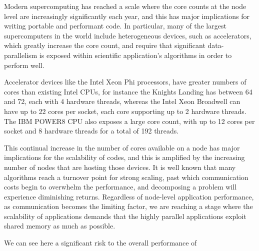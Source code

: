 \documentclass[runningheads,a4paper]{llncs}
\begin{document}
\label{sec:scalability-inhibit}

Modern supercomputing has reached a scale where the core counts at the node level are increasingly significantly each year, and this has major implications for writing portable and performant code. In particular, many of the largest supercomputers in the world include heterogeneous devices, such as accelerators, which greatly increase the core count, and require that significant data-parallelism is exposed within scientific application's algorithms in order to perform well.

Accelerator devices like the Intel Xeon Phi processors, have greater numbers of cores than existing Intel CPUs, for instance the Knights Landing has between 64 and 72, each with 4 hardware threads, whereas the Intel Xeon Broadwell can have up to 22 cores per socket, each core supporting up to 2 hardware threads. The IBM POWER8 CPU also exposes a large core count, with up to 12 cores per socket and 8 hardware threads for a total of 192 threads.

This continual increase in the number of cores available on a node has major implications for the scalability of codes, and this is amplified by the increasing number of nodes that are hosting those devices. It is well known that many algorithms reach a turnover point for strong scaling, past which communication costs begin to overwhelm the performance, and decomposing a problem will experience diminishing returns. Regardless of node-level application performance, as communication becomes the limiting factor, we are reaching a stage where the scalability of applications demands that the highly parallel applications exploit shared memory as much as possible.

We can see here a significant risk to the overall performance of 


\end{document}
